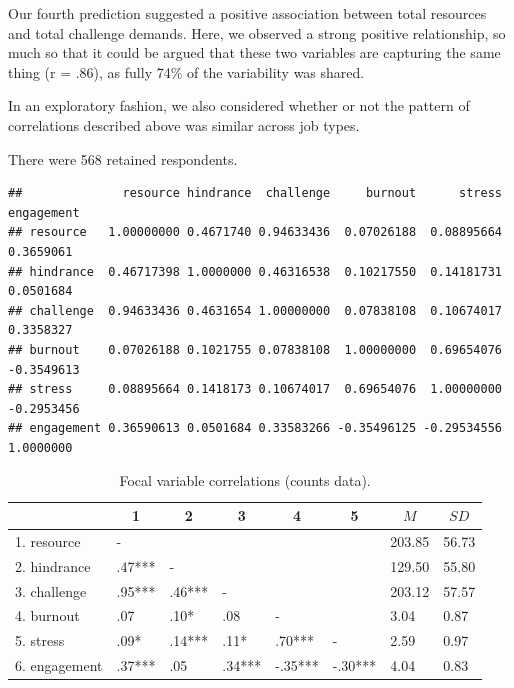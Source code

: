 \documentclass[
  man]{apa6}
\begin{document}
Our fourth prediction suggested a positive association between total resources and total challenge demands. Here, we observed a strong positive relationship, so much so that it could be argued that these two variables are capturing the same thing (r = .86), as fully 74\% of the variability was shared.

In an exploratory fashion, we also considered whether or not the pattern of correlations described above was similar across job types.

There were 568 retained respondents.

\begin{verbatim}
##              resource hindrance  challenge     burnout      stress engagement
## resource   1.00000000 0.4671740 0.94633436  0.07026188  0.08895664  0.3659061
## hindrance  0.46717398 1.0000000 0.46316538  0.10217550  0.14181731  0.0501684
## challenge  0.94633436 0.4631654 1.00000000  0.07838108  0.10674017  0.3358327
## burnout    0.07026188 0.1021755 0.07838108  1.00000000  0.69654076 -0.3549613
## stress     0.08895664 0.1418173 0.10674017  0.69654076  1.00000000 -0.2953456
## engagement 0.36590613 0.0501684 0.33583266 -0.35496125 -0.29534556  1.0000000
\end{verbatim}

\begin{table}[tbp]

\begin{center}
\begin{threeparttable}

\caption{\label{tab:correlation_table}Focal variable correlations (counts data).}

\begin{tabular}{llllllll}
\toprule
 & \multicolumn{1}{c}{1} & \multicolumn{1}{c}{2} & \multicolumn{1}{c}{3} & \multicolumn{1}{c}{4} & \multicolumn{1}{c}{5} & \multicolumn{1}{c}{$M$} & \multicolumn{1}{c}{$SD$}\\
\midrule
1. resource & - &  &  &  &  & 203.85 & 56.73\\
2. hindrance & .47*** & - &  &  &  & 129.50 & 55.80\\
3. challenge & .95*** & .46*** & - &  &  & 203.12 & 57.57\\
4. burnout & .07 & .10* & .08 & - &  & 3.04 & 0.87\\
5. stress & .09* & .14*** & .11* & .70*** & - & 2.59 & 0.97\\
6. engagement & .37*** & .05 & .34*** & -.35*** & -.30*** & 4.04 & 0.83\\
\bottomrule
\end{tabular}

\end{threeparttable}
\end{center}

\end{table}
\end{document}
